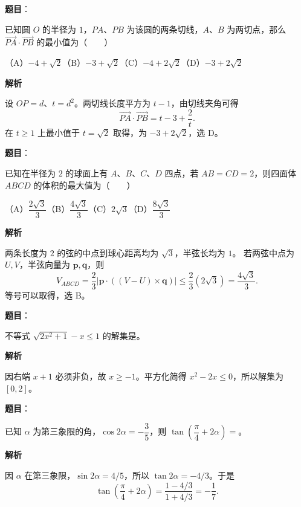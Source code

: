 \begin{answer}

\textbf{题目}：

已知圆 $O$ 的半径为 $1$，$PA\text{、}PB$ 为该圆的两条切线，$A\text{、}B$ 为两切点，那么 $\overrightarrow{PA}\cdot\overrightarrow{PB}$ 的最小值为\mbox{（　　）}

（A）$-4+\sqrt2$\quad（B）$-3+\sqrt2$\quad（C）$-4+2\sqrt2$\quad（D）$-3+2\sqrt2$

\textbf{解析}

设 $OP=d$、$t=d^2$。两切线长度平方为 $t-1$，由切线夹角可得
\nopagebreak[4]
\[
\overrightarrow{PA}\cdot\overrightarrow{PB}=t-3+\frac2t.
\]
在 $t\geq1$ 上最小值于 $t=\sqrt2$ 取得，为 $-3+2\sqrt2$，选 D。


\end{answer}
\begin{answer}

\textbf{题目}：

已知在半径为 $2$ 的球面上有 $A\text{、}B\text{、}C\text{、}D$ 四点，若 $AB=CD=2$，则四面体 $ABCD$ 的体积的最大值为\mbox{（　　）}

（A）$\dfrac{2\sqrt3}{3}$\quad（B）$\dfrac{4\sqrt3}{3}$\quad（C）$2\sqrt3$\quad（D）$\dfrac{8\sqrt3}{3}$

\textbf{解析}

两条长度为 $2$ 的弦的中点到球心距离均为 $\sqrt3$，半弦长均为 $1$。
若两弦中点为 $U,V$，半弦向量为 $\boldsymbol p,\boldsymbol q$，则
\nopagebreak[4]
\[
V_{ABCD}=\frac23\left|\boldsymbol p\cdot((V-U)\times\boldsymbol q)\right|
\leq\frac23(2\sqrt3)=\frac{4\sqrt3}{3}.
\]
等号可以取得，选 B。


\end{answer}
\begin{answer}

\textbf{题目}：

不等式 $\sqrt{2x^2+1}-x\leq1$ 的解集是\gkblank{}。

\textbf{解析}

因右端 $x+1$ 必须非负，故 $x\geq-1$。平方化简得
$x^2-2x\leq0$，所以解集为 $[0,2]$。


\end{answer}
\begin{answer}

\textbf{题目}：

已知 $\alpha$ 为第三象限的角，$\cos2\alpha=-\dfrac35$，则 $\tan\left(\dfrac\pi4+2\alpha\right)=$\gkblank{}。

\textbf{解析}

因 $\alpha$ 在第三象限，$\sin2\alpha=4/5$，所以 $\tan2\alpha=-4/3$。于是
\nopagebreak[4]
\[
\tan\left(\frac\pi4+2\alpha\right)=\frac{1-4/3}{1+4/3}=-\frac17.
\]


\end{answer}
